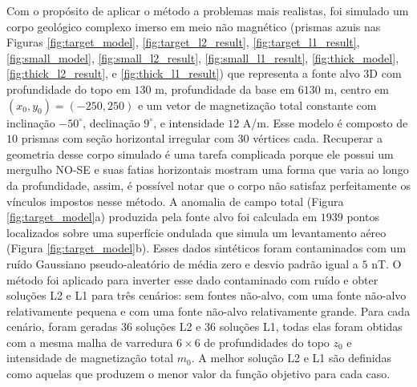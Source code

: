 Com o propósito de aplicar o método a problemas mais realistas, foi simulado um corpo geológico complexo imerso em meio não magnético (prismas azuis nas Figuras 
\ref{fig:target_model}, \ref{fig:target_l2_result}, \ref{fig:target_l1_result},
\ref{fig:small_model}, \ref{fig:small_l2_result}, \ref{fig:small_l1_result}, 
\ref{fig:thick_model}, \ref{fig:thick_l2_result}, e \ref{fig:thick_l1_result})
que representa a fonte alvo 3D com profundidade do topo em $130$ m, profundidade da base em $6130$ m, centro em $ (x_0, y_0) = (-250, 250) $ e um vetor de magnetização total constante com inclinação $-50^{\circ}$, 
declinação $9^{\circ}$, e intensidade $12$ A/m. 
Esse modelo é composto de $ 10 $ prismas com seção horizontal irregular com $ 30 $ vértices cada.
Recuperar a geometria desse corpo simulado é uma tarefa complicada porque ele possui um mergulho NO-SE e suas fatias horizontais mostram uma forma que varia ao longo da profundidade, assim, é possível notar que o corpo não satisfaz perfeitamente os vínculos impostos nesse método.
A anomalia de campo total (Figura \ref{fig:target_model}a) produzida pela fonte alvo foi calculada em $1939$ pontos localizados sobre uma superfície ondulada que simula um levantamento aéreo (Figura \ref{fig:target_model}b). Esses dados sintéticos foram contaminados com um ruído Gaussiano pseudo-aleatório de média zero e desvio padrão igual a $5$ nT.
O método foi aplicado para inverter esse dado contaminado com ruído e obter soluções L2 e L1 para três cenários: sem fontes não-alvo, 
com uma fonte não-alvo relativamente pequena e com uma fonte não-alvo relativamente grande.
Para cada cenário, foram geradas $36$ soluções L2 e $36$ soluções L1, 
todas elas foram obtidas com a mesma malha de varredura $6 \times 6$ de profundidades do topo $z_{0}$ e intensidade de magnetização total $m_{0}$.
A melhor solução L2 e L1 são definidas como aquelas que produzem o menor valor da função objetivo para cada caso.


